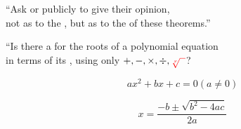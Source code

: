\begin{frame}{}
  \begin{center}
  \end{center}

  \begin{columns}
      \pause
      \begin{center}
      \end{center}
      \pause
      \begin{center}
      \end{center}
      \pause
      \begin{center}
      \end{center}
  \end{columns}
\end{frame}

\begin{frame}{}
  \begin{center}
    ``Ask  or  publicly to give their opinion, \\[6pt]
    not as to the , but as to the  of these theorems.''
  \end{center}
\end{frame}

\begin{frame}{}
  \begin{center}
    ``Is there a  for the roots of a 
    polynomial equation \\[8pt]
    in terms of its ,
    using only $+, -, \times, \div, \textcolor{red}{\sqrt[r]{\;\;}}$?
  \end{center}
\end{frame}

\begin{frame}{}
  \[
    ax^2 + bx + c = 0 (a \neq 0)
  \]

  \vspace{3em}
  \[
    x = \frac{-b \pm \sqrt{b^2 - 4ac}}{2a}
  \]
\end{frame}

